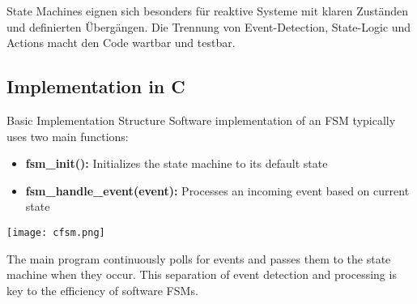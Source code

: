 \begin{remark}
    State Machines eignen sich besonders für reaktive Systeme mit klaren Zuständen und definierten Übergängen. Die Trennung von Event-Detection, State-Logic und Actions macht den Code wartbar und testbar.
\end{remark} 
\raggedcolumns
\columnbreak

\subsection{Implementation in C}

\begin{concept}{Basic Implementation Structure}
Software implementation of an FSM typically uses two main functions:
\begin{itemize}
    \item \textbf{fsm\_init():} Initializes the state machine to its default state
    \item \textbf{fsm\_handle\_event(event):} Processes an incoming event based on current state
\end{itemize}
\texttt{[image: cfsm.png]}

The main program continuously polls for events and passes them to the state machine when they occur. This separation of event detection and processing is key to the efficiency of software FSMs.
\end{concept}


